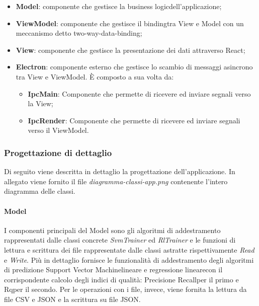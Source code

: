	\begin{itemize}
		\item \textbf{Model}: componente che gestisce la business logic\glosp dell'applicazione;
		\item \textbf{ViewModel}: componente che gestisce il binding\glosp tra View e Model con un meccanismo detto two-way-data-binding;
		\item \textbf{View}: componente che gestisce la presentazione dei dati attraverso React;
		\item \textbf{Electron}: componente esterno che gestisce lo scambio di messaggi asincrono tra View e ViewModel. È composto a sua volta da:
			\begin{itemize}
				\item \textbf{IpcMain}: Componente che permette di ricevere ed inviare segnali verso la View;
				\item \textbf{IpcRender}: Componente che permette di ricevere ed inviare segnali verso il ViewModel.
			\end{itemize}
	\end{itemize}
	\subsubsection{Progettazione di dettaglio}
		Di seguito viene descritta in dettaglio la progettazione dell'applicazione. In allegato viene fornito il file \textit{diagramma-classi-app.png} contenente l'intero diagramma delle classi.
		\paragraph{Model}
		I componenti principali del Model sono gli algoritmi di addestramento rappresentati dalle classi concrete \textit{SvmTrainer} ed \textit{RlTrainer} e le funzioni di lettura e scrittura dei file rappresentate dalle classi astratte rispettivamente \textit{Read} e \textit{Write}.
		Più in dettaglio fornisce le funzionalità di addestramento degli algoritmi di predizione Support Vector Machine\glosp lineare e regressione lineare\glosp con il corrispondente calcolo degli indici di qualità: Precision\glosp e Recall\glosp per il primo e Rq\glosp per il secondo. Per le operazioni con i file, invece, viene fornita la lettura da file CSV e JSON e la scrittura su file JSON.
